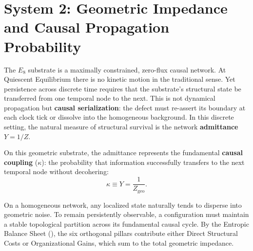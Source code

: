 \section{System 2: Geometric Impedance and Causal Propagation Probability}
\label{sec:system2_geometric_impedance}


The $E_8$ substrate is a maximally constrained, zero-flux causal network. At Quiescent Equilibrium there is no kinetic motion in the traditional sense. Yet persistence across discrete time requires that the substrate's structural state be transferred from one temporal node to the next. This is not dynamical propagation but \textbf{causal serialization}: the defect must re-assert its boundary at each clock tick or dissolve into the homogeneous background. In this discrete setting, the natural measure of structural survival is the network \textbf{admittance} $Y = 1/Z$.

On this geometric substrate, the admittance represents the fundamental \textbf{causal coupling} ($\kappa$): the probability that information successfully transfers to the next temporal node without decohering:
\begin{equation}
    \kappa \equiv Y = \frac{1}{Z_{\mathrm{geo}}}.
\end{equation}

On a homogeneous network, any localized state naturally tends to disperse into geometric noise. To remain persistently observable, a configuration must maintain a stable topological partition across its fundamental causal cycle.  By the Entropic Balance Sheet (), the six orthogonal pillars contribute either Direct Structural Costs or Organizational Gains, which sum to the total geometric impedance.

